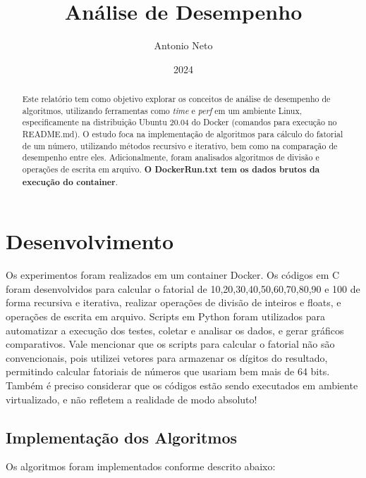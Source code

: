 \documentclass[12pt]{article}
\title{Análise de Desempenho}
\author{Antonio Neto}
\date{2024}
\begin{document}
\maketitle

\begin{abstract}
Este relatório tem como objetivo explorar os conceitos de análise de desempenho de algoritmos, utilizando ferramentas como \textit{time} e \textit{perf} em um ambiente Linux, especificamente na distribuição Ubuntu 20.04 do Docker (comandos para execução no README.md). O estudo foca na implementação de algoritmos para cálculo do fatorial de um número, utilizando métodos recursivo e iterativo, bem como na comparação de desempenho entre eles. Adicionalmente, foram analisados algoritmos de divisão e operações de escrita em arquivo. \textbf{O DockerRun.txt tem os dados brutos da execução do container}.
\end{abstract}

\tableofcontents

\newpage

\section{Desenvolvimento}
Os experimentos foram realizados em um container Docker. Os códigos em C foram desenvolvidos para calcular o fatorial de 10,20,30,40,50,60,70,80,90 e 100 de forma recursiva e iterativa, realizar operações de divisão de inteiros e floats, e operações de escrita em arquivo. Scripts em Python foram utilizados para automatizar a execução dos testes, coletar e analisar os dados, e gerar gráficos comparativos. Vale mencionar que os scripts para calcular o fatorial não são convencionais, pois utilizei vetores para armazenar os dígitos do resultado, permitindo calcular fatoriais de números que usariam bem mais de 64 bits. Também é preciso considerar que os códigos estão sendo executados em ambiente virtualizado, e não refletem a realidade de modo absoluto!

\subsection{Implementação dos Algoritmos}
Os algoritmos foram implementados conforme descrito abaixo:
\end{document}
